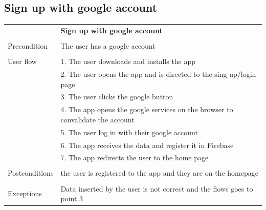 \documentclass[10pt]{article}
\begin{document}
    \subsection{Sign up with google account}
    \begin{tabular}{ p{3cm}|p{8cm} }
     &\textbf{Sign up with google account} \\
     \\
     Precondition & The user has a google account \\
     \\
     User flow 
     & 1. The user downloads and installs the app\\ 
     & 2. The user opens the app and is directed to the sing up/login page \\
     & 3. The user clicks the google button\\ 
     & 4. The app opens the google services on the browser to convalidate the account  \\
     & 5. The user log in with their google account\\
     & 6. The app receives the data and register it in Firebase\\
     & 7. The app redirects the user to the home page\\
     \\
     Postconditions & the user is registered to the app and they are on the homepage \\ 
     \\
     Exceptions & Data inserted by the user is not correct and the flows goes to point 3\\
    \end{tabular}
    \newline
    \newline
    \newline
\end{document}
